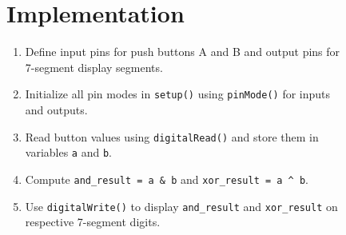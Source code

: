 \documentclass[12pt,a4paper]{article}
\begin{document}
\begin{figure}[H]
  \centering
  \begin{minipage}[t]{0.48\textwidth}
    \section*{Implementation}
    \small
    \begin{enumerate}[left=0pt]
      \item Define input pins for push buttons A and B and output pins for 7-segment display segments.
      \item Initialize all pin modes in \texttt{setup()} using \texttt{pinMode()} for inputs and outputs.
      \item Read button values using \texttt{digitalRead()} and store them in variables \texttt{a} and \texttt{b}.
      \item Compute \texttt{and\_result = a \& b} and \texttt{xor\_result = a \^{} b}.
      \item Use \texttt{digitalWrite()} to display \texttt{and\_result} and \texttt{xor\_result} on respective 7-segment digits.
    \end{enumerate}
  \end{minipage}\hfill
  \begin{minipage}[t]{0.48\textwidth}
  \end{minipage}
\end{figure}
\end{document}
